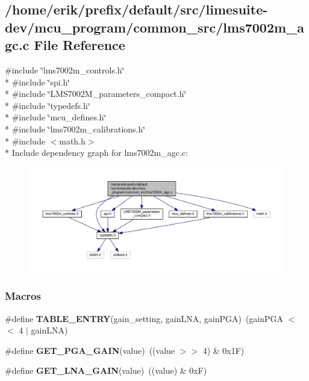 \subsection{/home/erik/prefix/default/src/limesuite-\/dev/mcu\+\_\+program/common\+\_\+src/lms7002m\+\_\+agc.c File Reference}
\label{lms7002m__agc_8c}
{\ttfamily \#include \char`\"{}lms7002m\+\_\+controls.\+h\char`\"{}}\\*
{\ttfamily \#include \char`\"{}spi.\+h\char`\"{}}\\*
{\ttfamily \#include \char`\"{}L\+M\+S7002\+M\+\_\+parameters\+\_\+compact.\+h\char`\"{}}\\*
{\ttfamily \#include \char`\"{}typedefs.\+h\char`\"{}}\\*
{\ttfamily \#include \char`\"{}mcu\+\_\+defines.\+h\char`\"{}}\\*
{\ttfamily \#include \char`\"{}lms7002m\+\_\+calibrations.\+h\char`\"{}}\\*
{\ttfamily \#include $<$math.\+h$>$}\\*
Include dependency graph for lms7002m\+\_\+agc.\+c\+:
\nopagebreak
\begin{figure}[H]
\begin{center}
\leavevmode
\includegraphics[width=350pt]{d1/ddc/lms7002m__agc_8c__incl}
\end{center}
\end{figure}
\subsubsection*{Macros}
\begin{DoxyCompactItemize}
\item 
\#define {\bf T\+A\+B\+L\+E\+\_\+\+E\+N\+T\+RY}(gain\+\_\+setting,  gain\+L\+NA,  gain\+P\+GA)~(gain\+P\+GA $<$$<$ 4 $\vert$ gain\+L\+NA)
\item 
\#define {\bf G\+E\+T\+\_\+\+P\+G\+A\+\_\+\+G\+A\+IN}(value)~((value $>$$>$ 4) \& 0x1\+F)
\item 
\#define {\bf G\+E\+T\+\_\+\+L\+N\+A\+\_\+\+G\+A\+IN}(value)~((value) \& 0x\+F)
\end{DoxyCompactItemize}
